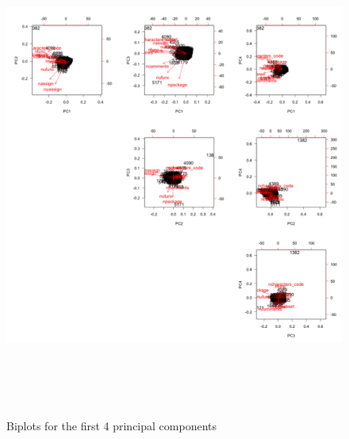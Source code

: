 \documentclass[12pt]{article}\usepackage[]{graphicx}\usepackage[]{color}
\begin{document}
\begin{figure}[H]
\centering
\includegraphics[width=16cm,height=16cm]{biplots}
\caption{Biplots for the first 4 principal components}
\end{figure}



% 
% 
% 
\end{document}
